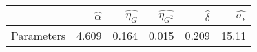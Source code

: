 \begin{tabular}{lrrrrr}
\toprule
{} &  $\hat{\alpha}$ &  $\hat{\eta_G}$ &  $\hat{\eta_{G^{2}}}$ &  $\hat{\delta}$ &  $\hat{\sigma_{\epsilon}}$ \\
\midrule
Parameters &           4.609 &           0.164 &                 0.015 &           0.209 &                      15.11 \\
\bottomrule
\end{tabular}
